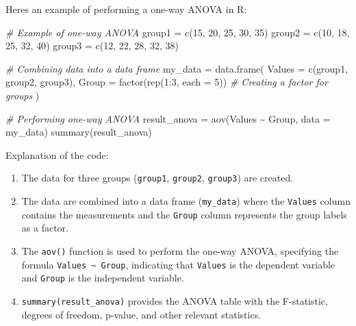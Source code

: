\documentclass[
]{article}
\newenvironment{Shaded}{}{}
\newcommand{\AttributeTok}[1]{\textcolor[rgb]{0.49,0.56,0.16}{#1}}
\newcommand{\CommentTok}[1]{\textcolor[rgb]{0.38,0.63,0.69}{\textit{#1}}}
\newcommand{\DecValTok}[1]{\textcolor[rgb]{0.25,0.63,0.44}{#1}}
\newcommand{\FunctionTok}[1]{\textcolor[rgb]{0.02,0.16,0.49}{#1}}
\newcommand{\NormalTok}[1]{#1}
\newcommand{\OtherTok}[1]{\textcolor[rgb]{0.00,0.44,0.13}{#1}}
\newcommand{\SpecialCharTok}[1]{\textcolor[rgb]{0.25,0.44,0.63}{#1}}
\begin{document}
Here\textquotesingle s an example of performing a one-way ANOVA in R:

\begin{Shaded}
\begin{Highlighting}[]
\CommentTok{\# Example of one{-}way ANOVA}
\NormalTok{group1 }\OtherTok{=} \FunctionTok{c}\NormalTok{(}\DecValTok{15}\NormalTok{, }\DecValTok{20}\NormalTok{, }\DecValTok{25}\NormalTok{, }\DecValTok{30}\NormalTok{, }\DecValTok{35}\NormalTok{)}
\NormalTok{group2 }\OtherTok{=} \FunctionTok{c}\NormalTok{(}\DecValTok{10}\NormalTok{, }\DecValTok{18}\NormalTok{, }\DecValTok{25}\NormalTok{, }\DecValTok{32}\NormalTok{, }\DecValTok{40}\NormalTok{)}
\NormalTok{group3 }\OtherTok{=} \FunctionTok{c}\NormalTok{(}\DecValTok{12}\NormalTok{, }\DecValTok{22}\NormalTok{, }\DecValTok{28}\NormalTok{, }\DecValTok{32}\NormalTok{, }\DecValTok{38}\NormalTok{)}

\CommentTok{\# Combining data into a data frame}
\NormalTok{my\_data }\OtherTok{=} \FunctionTok{data.frame}\NormalTok{(}
  \AttributeTok{Values =} \FunctionTok{c}\NormalTok{(group1, group2, group3),}
  \AttributeTok{Group =} \FunctionTok{factor}\NormalTok{(}\FunctionTok{rep}\NormalTok{(}\DecValTok{1}\SpecialCharTok{:}\DecValTok{3}\NormalTok{, }\AttributeTok{each =} \DecValTok{5}\NormalTok{))  }\CommentTok{\# Creating a factor for groups}
\NormalTok{)}

\CommentTok{\# Performing one{-}way ANOVA}
\NormalTok{result\_anova }\OtherTok{=} \FunctionTok{aov}\NormalTok{(Values }\SpecialCharTok{\textasciitilde{}}\NormalTok{ Group, }\AttributeTok{data =}\NormalTok{ my\_data)}
\FunctionTok{summary}\NormalTok{(result\_anova)}
\end{Highlighting}
\end{Shaded}

Explanation of the code:

\begin{enumerate}
\def\labelenumi{\arabic{enumi}.}
\item
  The data for three groups (\texttt{group1}, \texttt{group2},
  \texttt{group3}) are created.
\item
  The data are combined into a data frame (\texttt{my\_data}) where the
  \texttt{Values} column contains the measurements and the
  \texttt{Group} column represents the group labels as a factor.
\item
  The \texttt{aov()} function is used to perform the one-way ANOVA,
  specifying the formula \texttt{Values\ \textasciitilde{}\ Group},
  indicating that \texttt{Values} is the dependent variable and
  \texttt{Group} is the independent variable.
\item
  \texttt{summary(result\_anova)} provides the ANOVA table with the
  F-statistic, degrees of freedom, p-value, and other relevant
  statistics.
\end{enumerate}
\end{document}
